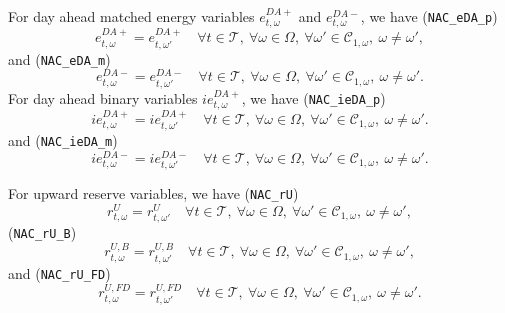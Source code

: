 For day ahead matched energy variables $e^{DA+}_{t, \omega}$ and $e^{DA-}_{t, \omega}$, we have (\verb|NAC_eDA_p|)
\begin{equation} \label{EQ:NAC_eDA_p}
	e^{DA+}_{t, \omega} = e^{DA+}_{t, \omega'} \quad \forall t \in \mathcal{T}, \ \forall \omega \in \Omega, \ \forall \omega' \in \mathcal{C}_{1, \omega}, \ \omega \neq \omega',
\end{equation}
and (\verb|NAC_eDA_m|)
\begin{equation} \label{EQ:NAC_eDA_m}
	e^{DA-}_{t, \omega} = e^{DA-}_{t, \omega'} \quad \forall t \in \mathcal{T}, \ \forall \omega \in \Omega, \ \forall \omega' \in \mathcal{C}_{1, \omega} , \ \omega \neq \omega'.
\end{equation}
For day ahead binary variables $ie^{DA+}_{t, \omega}$, we have (\verb|NAC_ieDA_p|)
\begin{equation} \label{EQ:NAC_ieDA_p}
	ie^{DA+}_{t, \omega} = ie^{DA+}_{t, \omega'} \quad \forall t \in \mathcal{T}, \ \forall \omega \in \Omega, \ \forall \omega' \in \mathcal{C}_{1, \omega} , \ \omega \neq \omega'.
\end{equation}
and (\verb|NAC_ieDA_m|)
\begin{equation} \label{EQ:NAC_ieDA_m}
	ie^{DA-}_{t, \omega} = ie^{DA-}_{t, \omega'} \quad \forall t \in \mathcal{T}, \ \forall \omega \in \Omega, \ \forall \omega' \in \mathcal{C}_{1, \omega} , \ \omega \neq \omega'.
\end{equation}


For upward reserve variables, we have (\verb|NAC_rU|)
\begin{equation} \label{EQ:NAC_pVRU}
	r^U_{t, \omega} = r^U_{t, \omega'} \quad \forall t \in \mathcal{T}, \ \forall \omega \in \Omega, \ \forall \omega' \in \mathcal{C}_{1, \omega}, \ \omega \neq \omega',
\end{equation}
(\verb|NAC_rU_B|)
\begin{equation} \label{EQ:NAC_rUB}
	r^{U, B}_{t, \omega} = r^{U, B}_{t, \omega'} \quad \forall t \in \mathcal{T}, \ \forall \omega \in \Omega, \ \forall \omega' \in \mathcal{C}_{1, \omega}, \ \omega \neq \omega',
\end{equation}
and (\verb|NAC_rU_FD|)
\begin{equation} \label{EQ:NAC_rUFD}
	r^{U, FD}_{t, \omega} = r^{U, FD}_{t, \omega'} \quad \forall t \in \mathcal{T}, \ \forall \omega \in \Omega, \ \forall \omega' \in \mathcal{C}_{1, \omega}, \ \omega \neq \omega'.
\end{equation}

